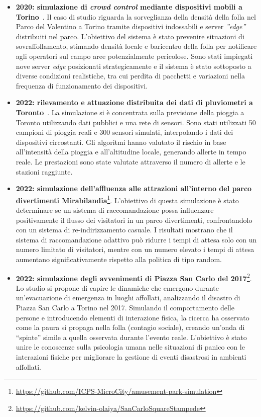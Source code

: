 \begin{itemize}
	\item \textbf{2020: simulazione di \textit{crowd control} mediante dispositivi mobili a Torino}~\cite{Audrito2021}.
	Il caso di studio riguarda la sorveglianza della densità della folla nel Parco del Valentino a Torino tramite dispositivi indossabili e server \textit{''edge''} distribuiti nel parco. L'obiettivo del sistema è stato prevenire situazioni di sovraffollamento, stimando densità locale e baricentro della folla per notificare agli operatori sul campo aree potenzialmente pericolose. Sono stati impiegati nove server \textit{edge} posizionati strategicamente e il sistema è stato sottoposto a diverse condizioni realistiche, tra cui perdita di pacchetti e variazioni nella frequenza di funzionamento dei dispositivi.
	\item \textbf{2022: rilevamento e attuazione distribuita dei dati di pluviometri a Toronto}~\cite{Aguzzi_2022}.
	La simulazione si è concentrata sulla previsione della pioggia a Toronto utilizzando dati pubblici e una rete di sensori. Sono stati utilizzati 50 campioni di pioggia reali e 300 sensori simulati, interpolando i dati dei dispositivi circostanti. Gli algoritmi hanno valutato il rischio in base all'intensità della pioggia e all'altitudine locale, generando allerte in tempo reale. Le prestazioni sono state valutate attraverso il numero di allerte e le stazioni raggiunte.
 	\item \textbf{2022:  simulazione dell'affluenza alle attrazioni all'interno del parco divertimenti Mirabilandia}\footnote{\url{https://github.com/ICPS-MicroCity/amusement-park-simulation}}.
	L'obiettivo di questa simulazione è stato determinare se un sistema di raccomandazione possa influenzare positivamente il flusso dei visitatori in un parco divertimenti, confrontandolo con un sistema di re-indirizzamento casuale. I risultati mostrano che il sistema di raccomandazione adattivo può ridurre i tempi di attesa solo con un numero limitato di visitatori, mentre con un numero elevato i tempi di attesa aumentano significativamente rispetto alla politica di tipo random.
	\item \textbf{2022: simulazione degli avvenimenti di Piazza San Carlo del 2017}\footnote{\url{https://github.com/kelvin-olaiya/SanCarloSquareStampede}}.
	Lo studio si propone di capire le dinamiche che emergono durante un'evacuazione di emergenza in luoghi affollati, analizzando il disastro di Piazza San Carlo a Torino nel 2017. Simulando il comportamento delle persone e introducendo elementi di interazione fisica, la ricerca ha osservato come la paura si propaga nella folla (contagio sociale), creando un'onda di ``spinte'' simile a quella osservata durante l'evento reale. L'obiettivo è stato unire le conoscenze sulla psicologia umana nelle situazioni di panico con le interazioni fisiche per migliorare la gestione di eventi disastrosi in ambienti affollati.
\end{itemize}

